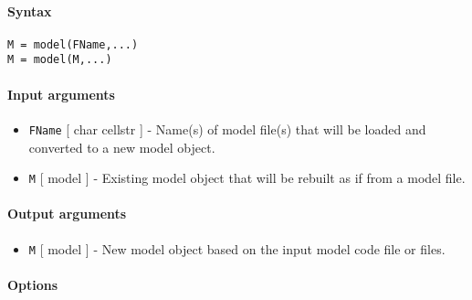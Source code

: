 


	\paragraph{Syntax}\label{syntax}

\begin{verbatim}
M = model(FName,...)
M = model(M,...)
\end{verbatim}

\paragraph{Input arguments}\label{input-arguments}

\begin{itemize}
\item
  \texttt{FName} {[} char \textbar{} cellstr {]} - Name(s) of model
  file(s) that will be loaded and converted to a new model object.
\item
  \texttt{M} {[} model {]} - Existing model object that will be rebuilt
  as if from a model file.
\end{itemize}

\paragraph{Output arguments}\label{output-arguments}

\begin{itemize}
\itemsep1pt\parskip0pt
\item
  \texttt{M} {[} model {]} - New model object based on the input model
  code file or files.
\end{itemize}

\paragraph{Options}\label{options}

